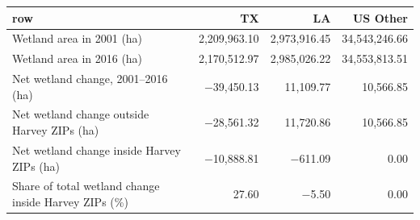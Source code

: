 \begin{tabular}{lrrr}
  \hline
row & TX & LA & US Other \\ 
  \hline
Wetland area in 2001 (ha) & 2,209,963.10 & 2,973,916.45 & 34,543,246.66 \\ 
  Wetland area in 2016 (ha) & 2,170,512.97 & 2,985,026.22 & 34,553,813.51 \\ 
  Net wetland change, 2001--2016 (ha) & $-$39,450.13 & 11,109.77 & 10,566.85 \\ 
  Net wetland change outside Harvey ZIPs (ha) & $-$28,561.32 & 11,720.86 & 10,566.85 \\ 
  Net wetland change inside Harvey ZIPs (ha) & $-$10,888.81 & $-$611.09 & 0.00 \\ 
  Share of total wetland change inside Harvey ZIPs (\%) & 27.60 & $-$5.50 & 0.00 \\ 
   \hline
\end{tabular}
